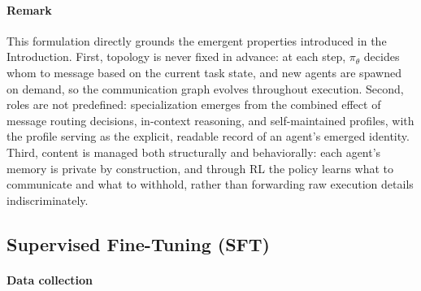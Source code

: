 \documentclass{article} %
\begin{document}
\paragraph{Remark}
This formulation directly grounds the emergent properties introduced in the Introduction.
First, topology is never fixed in advance: at each step, $\pi_\theta$ decides
whom to message based on the current task state, and new agents are spawned
on demand, so the communication graph evolves throughout execution.
Second, roles are not predefined: specialization emerges from the combined
effect of message routing decisions, in-context reasoning, and self-maintained
profiles, with the profile serving as the explicit, readable record of an agent's
emerged identity.
Third, content is managed both structurally and behaviorally: each agent's
memory is private by construction, and through RL the policy learns what to
communicate and what to withhold, rather than forwarding raw execution details
indiscriminately.

\subsection{Supervised Fine-Tuning (SFT)}

\paragraph{Data collection}
\end{document}
